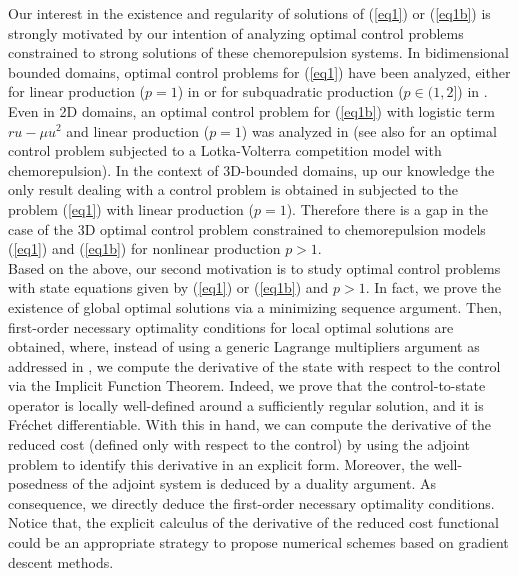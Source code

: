 \documentclass[11pt,reqno]{amsart}%
\numberwithin{equation}{section}
\begin{document}
Our interest in the existence 
and regularity of  solutions of (\ref{eq1}) or (\ref{eq1b})
is strongly motivated by our intention of analyzing  optimal control problems constrained
 to  strong solutions of these chemorepulsion systems. 
In  bidimensional bounded domains,  optimal control problems for (\ref{eq1}) have been analyzed, either for linear production ($p=1$) in \cite{Exequiel2D} or for subquadratic production ($p\in(1,2]$)  in \cite{EFE2D}. 
Even in 2D domains, an optimal control problem for 
 (\ref{eq1b}) with logistic term $ru-\mu u^2$ and linear production ($p=1$) was analyzed in \cite{Guillen4} (see also \cite{Hernandez} for an optimal control problem subjected to a Lotka-Volterra competition model with chemorepulsion). 
In the context of 3D-bounded domains, up our knowledge the only result dealing with a control problem is obtained in \cite{Exequiel3D} subjected to the problem (\ref{eq1}) with linear production ($p=1$). Therefore there is a gap in the case of the 3D optimal control problem constrained
to chemorepulsion models (\ref{eq1}) and  (\ref{eq1b}) for nonlinear production $p>1.$ \\

Based on the above, our second motivation is to study optimal control problems with state equations given by (\ref{eq1}) or (\ref{eq1b}) and $p>1$. In fact, we prove the existence of global optimal solutions via a minimizing sequence argument. 
Then,  first-order necessary optimality conditions for local optimal solutions are obtained,  where, instead of using a generic Lagrange multipliers argument as addressed in \cite{Guillen4,Andre_SICOM,Exequiel2D,Exequiel3D,EFE2D, Hernandez,linares, Lorca, rodriguez_rueda}, 
we compute the derivative of the state with respect to the control via  
the Implicit Function Theorem.
Indeed, 
we prove that the control-to-state operator is locally well-defined around a sufficiently regular solution, and it is Fr\'echet differentiable. 
With this in hand, 
we can compute the derivative of the reduced cost (defined only with respect to the control)
by using the adjoint problem to identify this derivative in an explicit form. Moreover, 
 the well-posedness of the adjoint system is deduced by a duality argument. 
As consequence, we directly deduce  the first-order necessary optimality conditions.
Notice that, the explicit calculus of the derivative of the reduced cost  functional could be  an appropriate strategy to propose numerical schemes 
 based on gradient descent methods.\\
 
\end{document}
